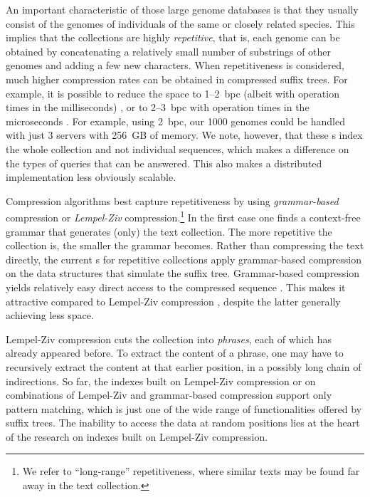 An important characteristic of those large genome databases is that they
usually consist of the genomes of individuals of the same or closely related
species. This implies that the collections are highly \emph{repetitive}, that
is, each genome can be obtained by concatenating a relatively small number of
substrings of other genomes
and adding a few new characters. When repetitiveness is considered, much higher
compression rates can be obtained in compressed suffix trees. For example, it is possible to reduce
the space to 1--2~bpc (albeit with operation times in the milliseconds)
\cite{Abeliuk2013}, or to 2--3~bpc with operation times in the microseconds
\cite{Navarro2014}. For example, using 2~bpc, our 1000 genomes could be handled
with just 3 servers with 256~GB of memory. We note, however, that these \CST{}s index
the whole collection and not individual sequences, which makes a difference on
the types of queries that can be answered. This also makes a distributed
implementation less obviously scalable.

Compression algorithms best capture repetitiveness by using \emph{grammar-based}
compression or \emph{Lempel-Ziv} compression.\footnote{We refer to ``long-range''
repetitiveness, where similar texts may be found far away in the text
collection.} In the first case \cite{KY00,CLLPPSS05} one finds a context-free
grammar that generates (only) the text collection. The more repetitive the
collection is, the smaller the grammar becomes. Rather than compressing the text directly,
the current \CST{}s for repetitive collections \cite{Abeliuk2013,Navarro2014}
apply grammar-based compression on the data structures that simulate the suffix tree.
Grammar-based compression yields relatively easy direct access to the compressed
sequence \cite{BLRSRW15}. This makes it attractive compared to Lempel-Ziv
compression \cite{ZL77}, despite the latter generally achieving less space.

Lempel-Ziv compression cuts the collection into \emph{phrases}, each of which
has already appeared before. To extract the content of a phrase, one may have
to recursively extract the content at that earlier position, in a possibly long
chain of indirections.
So far, the indexes built on Lempel-Ziv compression \cite{KN13} or on
combinations of Lempel-Ziv and grammar-based compression \cite{GGKNP12,GGKNP14,GP15}
support only pattern matching, which is just one of the wide range of
functionalities offered by suffix trees. The inability to access the data
at random positions lies at the heart of the research on indexes built on
Lempel-Ziv compression.


